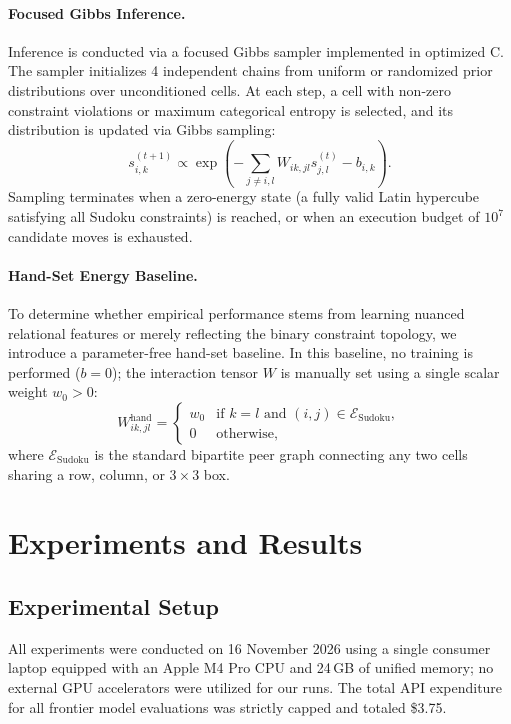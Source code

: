 \documentclass{article} %
\begin{document}
\paragraph{Focused Gibbs Inference.}
Inference is conducted via a focused Gibbs sampler implemented in optimized C. The sampler initializes 4 independent chains from uniform or randomized prior distributions over unconditioned cells. At each step, a cell with non-zero constraint violations or maximum categorical entropy is selected, and its distribution is updated via Gibbs sampling:
\begin{equation}
    s_{i,k}^{(t+1)} \propto \exp\left( - \sum_{j \neq i, l} W_{ik, jl} s_{j,l}^{(t)} - b_{i,k} \right).
\end{equation}
Sampling terminates when a zero-energy state (a fully valid Latin hypercube satisfying all Sudoku constraints) is reached, or when an execution budget of $10^7$ candidate moves is exhausted.

\paragraph{Hand-Set Energy Baseline.}
To determine whether empirical performance stems from learning nuanced relational features or merely reflecting the binary constraint topology, we introduce a parameter-free hand-set baseline. In this baseline, no training is performed ($b=0$); the interaction tensor $W$ is manually set using a single scalar weight $w_0 > 0$:
\begin{equation}
    W_{ik, jl}^{\text{hand}} = 
    \begin{cases}
        w_0 & \text{if } k = l \text{ and } (i, j) \in \mathcal{E}_{\text{Sudoku}}, \\
        0 & \text{otherwise},
    \end{cases}
\end{equation}
where $\mathcal{E}_{\text{Sudoku}}$ is the standard bipartite peer graph connecting any two cells sharing a row, column, or $3 \times 3$ box.

\section{Experiments and Results}
\label{sec:experiments}

\subsection{Experimental Setup}
All experiments were conducted on 16 November 2026 using a single consumer laptop equipped with an Apple M4 Pro CPU and 24\,GB of unified memory; no external GPU accelerators were utilized for our runs. The total API expenditure for all frontier model evaluations was strictly capped and totaled \$3.75.
\end{document}

